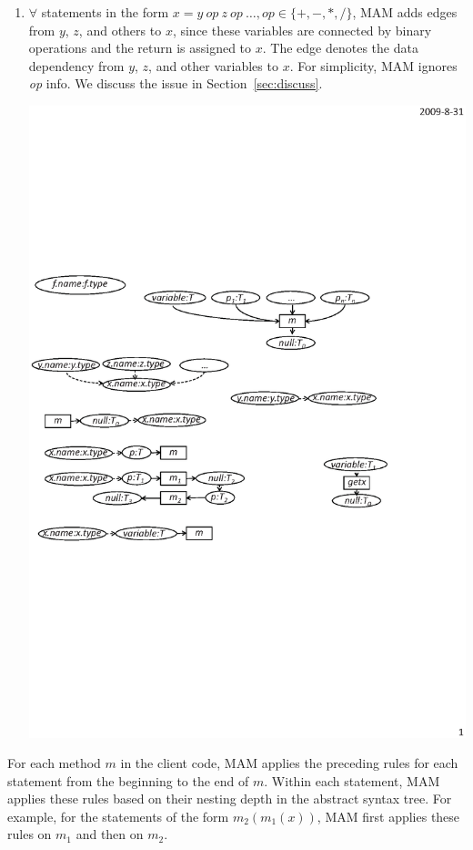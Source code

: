 \begin{enumerate}
\item $\forall$ statements in the form $ x = y\ op\ z\ op\ \ldots, op \in \{+,-,*,/\}$,
MAM adds edges from $y$, $z$, and others to $x$, since these
variables are connected by binary operations and the return is
assigned to $x$. The edge denotes the data dependency from $y$, $z$,
and other variables to $x$. For simplicity, MAM ignores
\emph{op} info. We discuss the issue in
Section~\ref{sec:discuss}.\vspace*{-1.5ex}
\begin{center}
\includegraphics[scale=0.7,clip]{figure/rule9.eps}%
\end{center}\vspace*{-2ex}
\end{enumerate}

For each method $m$ in the client code, MAM applies the preceding
rules for each statement from the beginning to the end of $m$.
Within each statement, MAM applies these rules based on
their nesting depth in the abstract syntax tree. For example,
for the statements of the form $m_2(m_1(x))$, MAM first applies
these rules on $m_1$ and then on $m_2$.


